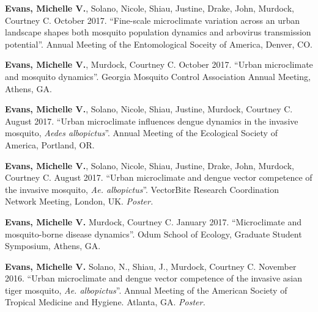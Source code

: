 
\begin{cvitems}
	\bigskip

	\item \textbf{Evans, Michelle V.}, Solano, Nicole, Shiau, Justine, Drake, John, Murdock, Courtney C. October 2017. ``Fine-scale microclimate variation across an urban landscape shapes both mosquito population dynamics and arbovirus transmission potential''. Annual Meeting of the Entomological Soceity of America, Denver, CO.

	\item \textbf{Evans, Michelle V.}, Murdock, Courtney C. October 2017. ``Urban microclimate and mosquito dynamics''. Georgia Mosquito Control Association Annual Meeting, Athens, GA.

	\item \textbf{Evans, Michelle V.}, Solano, Nicole, Shiau, Justine, Murdock, Courtney C. August 2017. ``Urban microclimate influences dengue dynamics in the invasive mosquito, \textit{Aedes albopictus}''. Annual Meeting of the Ecological Society of America, Portland, OR.

	\item \textbf{Evans, Michelle V.}, Solano, Nicole, Shiau, Justine, Drake, John, Murdock, Courtney C. August 2017. ``Urban microclimate and dengue vector competence of the invasive mosquito, \textit{Ae. albopictus}''. VectorBite Research Coordination Network Meeting, London, UK. \textit{Poster.}

	\item \textbf{Evans, Michelle V.} Murdock, Courtney C. January 2017. ``Microclimate and mosquito-borne disease dynamics''. Odum School of Ecology, Graduate Student Symposium, Athens, GA.

	\item \textbf{Evans, Michelle V.} Solano, N., Shiau, J., Murdock, Courtney C. November 2016. ``Urban microclimate and dengue vector competence of the invasive asian tiger mosquito, \textit{Ae. albopictus}''. Annual Meeting of the American Society of Tropical Medicine and Hygiene. Atlanta, GA. \textit{Poster.}


\end{cvitems}
